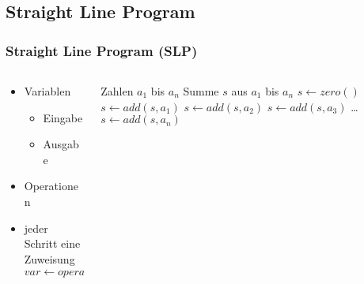 \subsection{Straight Line Program}
\begin{frame}
    \frametitle{Straight Line Program (SLP)}
    \begin{columns}
        \begin{column}{0.5\textwidth}
            \begin{itemize}
                \item Variablen
                    \begin{itemize}
                        \item Eingabe
                        \item Ausgabe
                    \end{itemize}
                \item Operationen
                \item jeder Schritt eine Zuweisung
                    \begin{equation*}
                        var \gets operation(a, b, c)
                    \end{equation*}
                    
            \end{itemize}
        \end{column}
        \begin{column}{0.5\textwidth}
            \begin{algorithmic}
                \Require Zahlen $a_1$ bis $a_n$
                \Ensure Summe $s$ aus $a_1$ bis $a_n$
                \State $s \gets zero()$
                \State $s \gets add(s, a_1)$
                \State $s \gets add(s, a_2)$
                \State $s \gets add(s, a_3)$
                \State \ldots
                \State $s \gets add(s, a_n)$
            \end{algorithmic}
        \end{column}
    \end{columns}
\end{frame}

